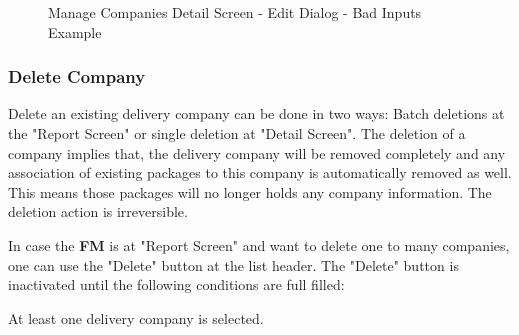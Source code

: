 \begin{figure}[H]
	\centering
    \vspace{5pt}
    \hspace{5pt}
    \caption{Manage Companies Detail Screen - Edit Dialog - Bad Inputs Example}
	\label{fig:MCDetailEditDlgBad}
\end{figure}

\subsubsection{Delete Company}

Delete an existing delivery company can be done in two ways: Batch deletions at the "Report Screen" or single deletion at "Detail Screen". The deletion of a company implies that, the delivery company will be removed completely and any association of existing packages to this company is automatically removed as well. This means those packages will no longer holds any company information. The deletion action is irreversible. 

In case the \textbf{FM} is at "Report Screen" and want to delete one to many companies, one can use the "Delete" button at the list header. The "Delete" button is inactivated until the following conditions are full filled:

\begin{compactenum}
    \item At least one delivery company is selected.
\end{compactenum}

